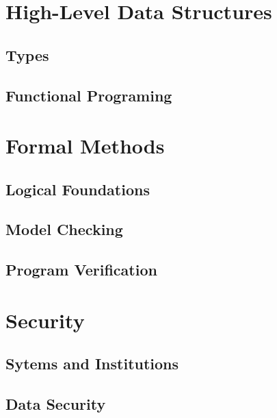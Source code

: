 \documentclass{book}
\begin{document}
\part{High-Level Data Structures}

  \chapter{Types}

  \chapter{Functional Programing}

\part{Formal Methods}

  \chapter{Logical Foundations}

  \chapter{Model Checking} %
    

  \chapter{Program Verification} %
   

\part{Security}

  \chapter{Sytems and Institutions}

  \chapter{Data Security}
    

\end{document}
